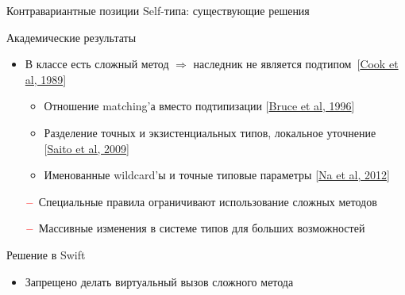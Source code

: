 \documentclass[usenames, dvipsnames]{beamer}
\begin{document}
\begin{frame}[fragile]{Контравариантные позиции Self-типа: существующие решения}
        \begin{block}{Академические результаты}
            \begin{itemize}
                \item В классе есть сложный метод $\Rightarrow$ наследник не является подтипом~[\href{https://dl.acm.org/doi/pdf/10.1145/96709.96721}{Cook et al, 1989}]
                \begin{itemize}
                    \item Отношение matching'а вместо подтипизации [\href{https://www.researchgate.net/profile/Kim-Bruce-2/publication/221496196_Subtyping_Is_Not_a_Good_Match_for_Object-Oriented_Languages/links/09e415122545c6d7a4000000/Subtyping-Is-Not-a-Good-Match-for-Object-Oriented-Languages.pdf}{Bruce et al, 1996}]
                    \item Разделение точных и экзистенциальных типов, локальное уточнение [\href{https://citeseerx.ist.psu.edu/document?repid=rep1&type=pdf&doi=a9d601d3bf8c921748902d58078d0a1b28f6ec4d}{Saito et al, 2009}]
                    \item Именованные wildcard'ы и точные типовые параметры [\href{https://www.researchgate.net/profile/Sukyoung-Ryu/publication/254004584_Exact_type_parameterization_and_ThisType_support/links/54b90ed10cf269d8cbf72d01/Exact-type-parameterization-and-ThisType-support.pdf}{Na et al, 2012}]
                \end{itemize}
                \item[$\color{red} -$] Специальные правила ограничивают использование сложных методов
                \item[$\color{red} -$] Массивные изменения в системе типов для больших возможностей
            \end{itemize}
        \end{block}

        \begin{block}{Решение в Swift}
            \begin{itemize}
                \item Запрещено делать виртуальный вызов сложного метода
            \end{itemize}
        \end{block}
    \end{frame}
\end{document}
